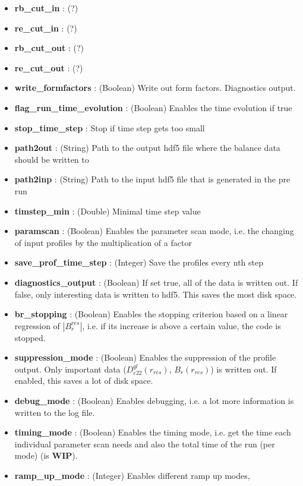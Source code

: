 \documentclass{article}
\begin{document}
\begin{itemize}
	\item \textbf{rb\_cut\_in} : (?)
	\item \textbf{re\_cut\_in} : (?)
	\item \textbf{rb\_cut\_out} : (?)
	\item \textbf{re\_cut\_out} : (?)
	\item \textbf{write\_formfactors} : (Boolean) Write out form factors. Diagnostics output.
	\item \textbf{flag\_run\_time\_evolution} : (Boolean) Enables the time evolution if true
	\item \textbf{stop\_time\_step} : Stop if time step gets too small
	\item \textbf{path2out} : (String) Path to the output hdf5 file where the balance data should be written to
	\item \textbf{path2inp }: (String) Path to the input hdf5 file that is generated in the pre run
	\item \textbf{timstep\_min} : (Double) Minimal time step value
	\item \textbf{paramscan} : (Boolean) Enables the parameter scan mode, i.e. the changing of input profiles by the multiplication of a factor
	\item \textbf{save\_prof\_time\_step} : (Integer) Save the profiles every nth step
	\item \textbf{diagnostics\_output} : (Boolean) If set true, all of the data is written out. If false, only interesting data is written to hdf5. This saves the most disk space.
	\item \textbf{br\_stopping} : (Boolean) Enables the stopping criterion based on a linear regression of $|B_r^{res}|$, i.e. if its increase is above a certain value, the code is stopped.
	\item \textbf{suppression\_mode} : (Boolean) Enables the suppression of the profile output. Only important data ($D_{e22}^{ql}(r_{res})$, $B_r(r_{res})$) is written out. If enabled, this saves a lot of disk space.
	\item \textbf{debug\_mode} : (Boolean) Enables debugging, i.e. a lot more information is written to the log file.
	\item \textbf{timing\_mode} : (Boolean) Enables the timing mode, i.e. get the time each individual parameter scan needs and also the total time of the run (per mode) (is \textbf{WIP}).
	\item \textbf{ramp\_up\_mode} : (Integer) Enables different ramp up modes, 
	\begin{itemize}

\end{itemize}
\end{itemize}
\end{document}
